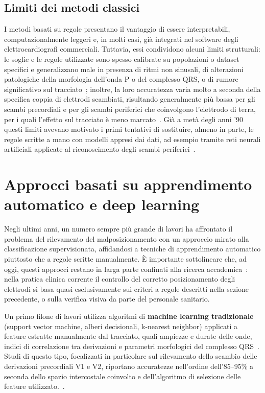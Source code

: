 \subsection{Limiti dei metodi classici}

I metodi basati su regole presentano il vantaggio di essere interpretabili, computazionalmente leggeri e, in molti casi, già integrati nel software degli elettrocardiografi commerciali. Tuttavia, essi condividono alcuni limiti strutturali: le soglie e le regole utilizzate sono spesso calibrate su popolazioni o dataset specifici e generalizzano male in presenza di ritmi non sinusali, di alterazioni patologiche della morfologia dell'onda P o del complesso QRS, o di rumore significativo sul tracciato~\cite{batchvarov2007incorrect}; inoltre, la loro accuratezza varia molto a seconda della specifica coppia di elettrodi scambiati, risultando generalmente più bassa per gli scambi precordiali e per gli scambi periferici che coinvolgono l'elettrodo di terra, per i quali l'effetto sul tracciato è meno marcato~\cite{kors2001accurate, batchvarov2007incorrect}. Già a metà degli anni '90 questi limiti avevano motivato i primi tentativi di sostituire, almeno in parte, le regole scritte a mano con modelli appresi dai dati, ad esempio tramite reti neurali artificiali applicate al riconoscimento degli scambi periferici~\cite{heden1995ann}.

\section{Approcci basati su apprendimento automatico e deep learning}

Negli ultimi anni, un numero sempre più grande di lavori ha affrontato il problema del rilevamento del malposizionamento con un approccio mirato alla classificazione supervisionata, affidandosi a tecniche di apprendimento automatico piuttosto che a regole scritte manualmente. È importante sottolineare che, ad oggi, questi approcci restano in larga parte confinati alla ricerca accademica~\cite{rjoob2020review}: nella pratica clinica corrente il controllo del corretto posizionamento degli elettrodi si basa quasi esclusivamente sui criteri a regole descritti nella sezione precedente, o sulla verifica visiva da parte del personale sanitario.

Un primo filone di lavori utilizza algoritmi di \textbf{machine learning tradizionale} (support vector machine, alberi decisionali, k-nearest neighbor) applicati a feature estratte manualmente dal tracciato, quali ampiezze e durate delle onde, indici di correlazione tra derivazioni e parametri morfologici del complesso QRS~\cite{han2014svm}. Studi di questo tipo, focalizzati in particolare sul rilevamento dello scambio delle derivazioni precordiali V1 e V2, riportano accuratezze nell'ordine dell'85--95\% a seconda dello spazio intercostale coinvolto e dell'algoritmo di selezione delle feature utilizzato.~\cite{rjoob2019datadriven}.

